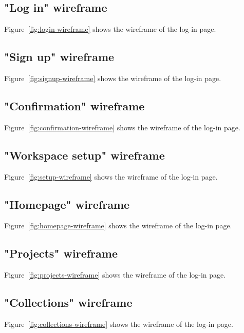 \begin{toexclude}

	\subsection{"Log in" wireframe}
	Figure~\ref{fig:login-wireframe} shows the wireframe of the log-in page.


	\subsection{"Sign up" wireframe}
	Figure~\ref{fig:signup-wireframe} shows the wireframe of the log-in page.


	\subsection{"Confirmation" wireframe}
	Figure~\ref{fig:confirmation-wireframe} shows the wireframe of the log-in page.


	\subsection{"Workspace setup" wireframe}
	Figure~\ref{fig:setup-wireframe} shows the wireframe of the log-in page.


	\subsection{"Homepage" wireframe}
	Figure~\ref{fig:homepage-wireframe} shows the wireframe of the log-in page.


	\subsection{"Projects" wireframe}
	Figure~\ref{fig:projects-wireframe} shows the wireframe of the log-in page.


	\subsection{"Collections" wireframe}
	Figure~\ref{fig:collections-wireframe} shows the wireframe of the log-in page.


\end{toexclude}
